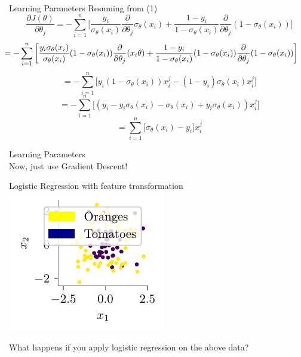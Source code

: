 \documentclass{beamer}
\begin{document}
\begin{frame}{Learning Parameters}
Resuming from (1)
\begin{equation*}
\frac{\partial J(\theta)}{\partial \theta_{j}} = -\sum_{i=1}^{n}\bigg[\frac{y_{i}}{\sigma_{\theta}(x_{i})} \frac{\partial}{\partial \theta_{j}} \sigma_{\theta}(x_{i}) + \frac{1 - y_{i}}{1 - \sigma_{\theta}(x_{i})} \frac{\partial}{\partial \theta_{j}}(1 - \sigma_{\theta}(x_{i}))\bigg]
\end{equation*}
\begin{equation*}
\hspace{-0.7cm}= -\sum_{i=1}^{n}\bigg[\frac{y_{i}\sigma_{\theta}(x_{i})}{\sigma_{\theta}(x_{i})}(1 - \sigma_{\theta}(x_{i}))\frac{\partial}{\partial \theta_{j}} (x_{i}\theta) + \frac{1 - y_{i}}{1 - \sigma_{\theta}(x_{i})}(1 - \sigma_{\theta}(x_{i})) \frac{\partial}{\partial \theta_{j}}(1 - \sigma_{\theta}(x_{i}))\bigg]
\end{equation*}
\begin{equation*}
= -\sum_{i=1}^{n}\bigg[y_{i}(1 - \sigma_{\theta}(x_{i}))x_{i}^{j} - (1 - y_{i})\sigma_{\theta}(x_{i})x_{i}^{j}\bigg]
\end{equation*}
\begin{equation*}
= -\sum_{i=1}^{n}\bigg[(y_{i} - y_{i}\sigma_{\theta}(x_{i}) - \sigma_{\theta}(x_{i}) + y_{i}\sigma_{\theta}(x_{i}))x_{i}^{j}\bigg]
\end{equation*}
\begin{equation*}
= \sum_{i=1}^{n}\bigg[\sigma_{\theta}(x_{i}) - y_{i}\bigg]x_{i}^{j}
\end{equation*}
\end{frame}
\begin{frame}{Learning Parameters}
\centering
{} \\
\vspace{0.3cm}
Now, just use Gradient Descent!
\end{frame}



\begin{frame}{Logistic Regression with feature transformation}
\includegraphics{../assets/logistic-regression/figures/logisitic-circular-data.pdf}

What happens if you apply logistic regression on the above data?
\end{frame}
\end{document}
